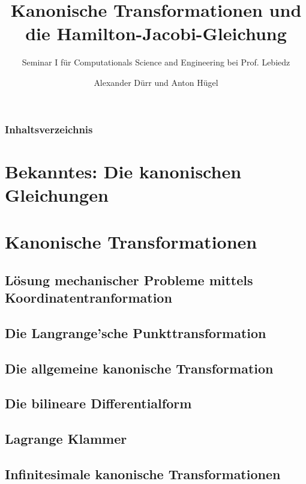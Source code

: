 \documentclass{beamer}
\title{Kanonische Transformationen und die Hamilton-Jacobi-Gleichung}
\subtitle{Seminar I für Computationals Science and Engineering bei Prof. Lebiedz}
\author{Alexander Dürr und Anton Hügel}
\institute
{\\Universität Ulm, Institut für Numerische Mathematik}
\begin{document}
\hspace*{-1.49cm}
\frame[plain]{\titlepage}

\hspace*{-0.7cm}
\begin{frame}
  \frametitle{Inhaltsverzeichnis}
  \tableofcontents
\end{frame}


\section{Bekanntes: Die kanonischen Gleichungen}

\section{Kanonische Transformationen}
    

    \subsection{Lösung mechanischer Probleme mittels Koordinatentranformation}
    
    
    \subsection{Die Langrange'sche Punkttransformation}
    
    
    \subsection{Die allgemeine kanonische Transformation}
    
    
    \subsection{Die bilineare Differentialform}
    
    
    \subsection{Lagrange Klammer}
    
    
    \subsection{Infinitesimale kanonische Transformationen}
    
\end{document}
